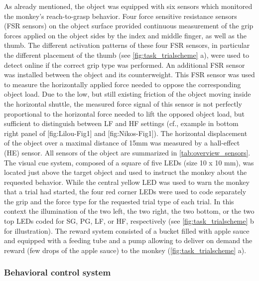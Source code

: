 {As already mentioned, the object was equipped with six sensors which monitored the monkey's reach-to-grasp behavior. Four force sensitive resistance sensors (FSR sensors) on the object surface provided continuous measurement of the grip forces applied on the object sides by the index and middle finger, as well as the thumb. The different activation patterns of these four FSR sensors, in particular the different placement of the thumb (see \cref{fig:task_trialscheme} a), were used to detect online if the correct grip type was performed. An additional FSR sensor was installed between the object and its counterweight. This FSR sensor was used to measure the horizontally applied force needed to oppose the corresponding object load. Due to the low, but still existing friction of the object moving inside the horizontal shuttle, the measured force signal of this sensor is not perfectly proportional to the horizontal force needed to lift the opposed object load, but sufficient to distinguish between LF and HF settings (cf., example in bottom right panel of [fig:Lilou-Fig1] and [fig:Nikos-Fig1]). The horizontal displacement of the object over a maximal distance of 15mm was measured by a hall-effect (HE) sensor. All sensors of the object are summarized in \cref{tab:overview_sensors}. The visual cue system, composed of a square of five LEDs (size 10 x 10 mm), was located just above the target object and used to instruct the monkey about the requested behavior. While the central yellow LED was used to warn the monkey that a trial had started, the four red corner LEDs were used to code separately the grip and the force type for the requested trial type of each trial. In this context the illumination of the two left, the two right, the two bottom, or the two top LEDs coded for SG, PG, LF, or HF, respectively (see \cref{fig:task_trialscheme} b for illustration). The reward system consisted of a bucket filled with apple sauce and equipped with a feeding tube and a pump allowing to deliver on demand the reward (few drops of the apple sauce) to the monkey (\cref{fig:task_trialscheme} a).

\subsubsection{Behavioral control system}

}
